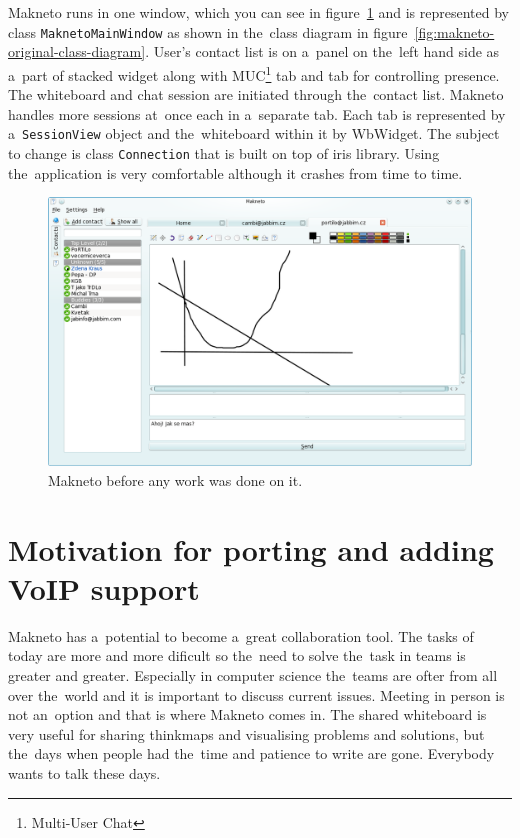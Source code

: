 Makneto runs in one window, which you can see in figure~\ref{fig:makneto-original} and is represented by class \verb|MaknetoMainWindow| as shown in the~class diagram in figure~\ref{fig:makneto-original-class-diagram}. User's contact list is on a~panel on the~left hand side as a~part of stacked widget along with MUC\footnote{Multi-User Chat} tab and tab for controlling presence. The whiteboard and chat session are initiated through the~contact list. Makneto handles more sessions at~once each in a~separate tab. Each tab is represented by a~\verb|SessionView| object and the~whiteboard within it by WbWidget. The subject to change is class \verb|Connection| that is built on top of iris library. Using the~application is very comfortable although it crashes from time to time.

\begin{figure}[ht]
\begin{center}
	\includegraphics[width=15cm]{fig/makneto-original.png}
	\caption{Makneto before any work was done on it.}
	\label{fig:makneto-original}
\end{center}
\end{figure}


\section{Motivation for porting and adding VoIP support}
Makneto has a~potential to become a~great collaboration tool. The tasks of today are more and more dificult so the~need to solve the~task in teams is greater and greater. Especially in computer science the~teams are ofter from all over the~world and it is important to discuss current issues. Meeting in person is not an~option and that is where Makneto comes in. The shared whiteboard is very useful for sharing thinkmaps and visualising problems and solutions, but the~days when people had the~time and patience to write are gone. Everybody wants to talk these days.  

